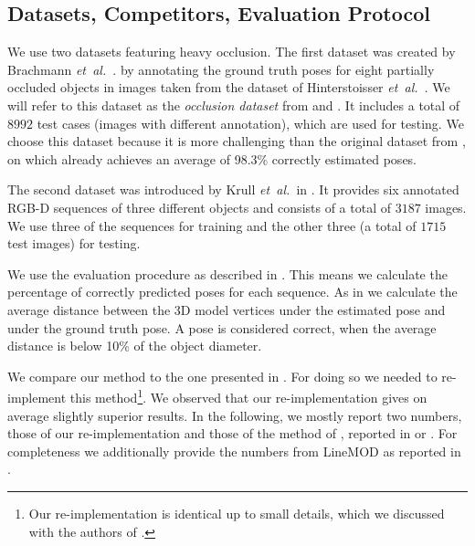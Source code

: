 \documentclass[10pt,letterpaper]{article}
\newcommand{\etal}{\mbox{\emph{et al.\ }}}
\begin{document}
\subsection{Datasets, Competitors, Evaluation Protocol}

 We use two datasets featuring heavy occlusion. The first dataset was created by Brachmann \etal. \cite{brachmann2014} by annotating the ground truth poses for eight partially occluded objects in images taken from the dataset of Hinterstoisser \etal \cite{hinterstoisser2012accv}. We will refer to this dataset as the \emph{occlusion dataset} from \cite{brachmann2014} and \cite{hinterstoisser2012accv}. It includes a total of $8992$ test cases (images with different annotation), which are used for testing. We choose this dataset because it is more challenging than the original dataset from \cite{hinterstoisser2012accv}, on which  \cite{brachmann2014} already achieves an average of 98.3\% correctly estimated poses.

The second dataset was introduced by Krull \etal in \cite{krull2014}.
It provides six annotated RGB-D sequences of three different objects and consists of a total of $3187$ images. We use three of the sequences for training and the other three (a total of $1715$ test images) for testing.

 We use the evaluation procedure as described in \cite{brachmann2014}. This means we calculate the percentage of correctly predicted poses for each sequence. As in \cite{hinterstoisser2012accv} we calculate the average distance between the 3D model vertices under the estimated pose and under the ground truth pose. A pose is considered correct, when the average distance is below 10\% of the object diameter.

 We compare our method to the one presented in \cite{brachmann2014}. For doing so we needed to re-implement this method\footnote{Our re-implementation is identical up to small details, which we discussed with the authors of \cite{brachmann2014}.}.  We observed that our re-implementation gives on average slightly superior results. In the following, we mostly report two numbers, those of our re-implementation and those of the method of \cite{brachmann2014}, reported in \cite{brachmann2014} or \cite{krull2014}. For completeness we additionally provide the numbers from LineMOD \cite{hinterstoisser2012accv} as reported in \cite{brachmann2014}.
\end{document}
